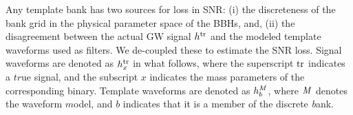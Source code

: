 Any template bank has two sources for loss in SNR: 
(i) the discreteness of the bank grid in the physical parameter space of the 
BBHs, and, (ii) the disagreement between the actual GW signal $h^{\mathrm{tr}}$ and the 
modeled template waveforms used as filters. We de-coupled these to estimate
the SNR loss. Signal waveforms are denoted as $h^{\mathrm{tr}}_x$ in what follows, 
where the superscript $\mathrm{tr}$ indicates a $tr$ue signal, and the subscript
$x$ indicates the mass parameters of the corresponding binary. Template
waveforms are denoted as $h^{\mathit{M}}_b$, where $\mathit{M}$ denotes the waveform $m$odel, and
$b$ indicates that it is a member of the discrete \textit{b}ank.

